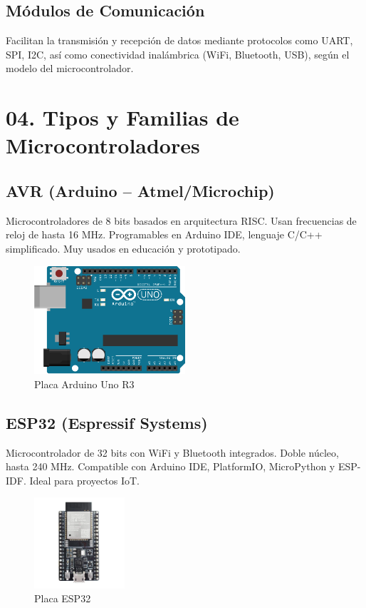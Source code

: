 \documentclass[a4paper,11pt]{article}
\begin{document}
\subsection{M\'odulos de Comunicaci\'on}
Facilitan la transmisi\'on y recepci\'on de datos mediante protocolos como UART, SPI, I2C, as\'i como conectividad inal\'ambrica (WiFi, Bluetooth, USB), seg\'un el modelo del microcontrolador.

\section{04. Tipos y Familias de Microcontroladores}

\subsection{AVR (Arduino – Atmel/Microchip)}
Microcontroladores de 8 bits basados en arquitectura RISC. Usan frecuencias de reloj de hasta 16 MHz. Programables en Arduino IDE, lenguaje C/C++ simplificado. Muy usados en educaci\'on y prototipado.

\begin{figure}[h]
  \centering
\includegraphics[width=0.5\textwidth]{img/ArduinoUNO.png}
  \caption{Placa Arduino Uno R3}
  \label{fig:uno}
\end{figure}


\subsection{ESP32 (Espressif Systems)}
Microcontrolador de 32 bits con WiFi y Bluetooth integrados. Doble n\'ucleo, hasta 240 MHz. Compatible con Arduino IDE, PlatformIO, MicroPython y ESP-IDF. Ideal para proyectos IoT.

\begin{figure}[H]
  \centering
\includegraphics[width=0.3\textwidth]{img/ESP32.png}
  \caption{Placa ESP32}
  \label{fig:uno}
\end{figure}
\end{document}
